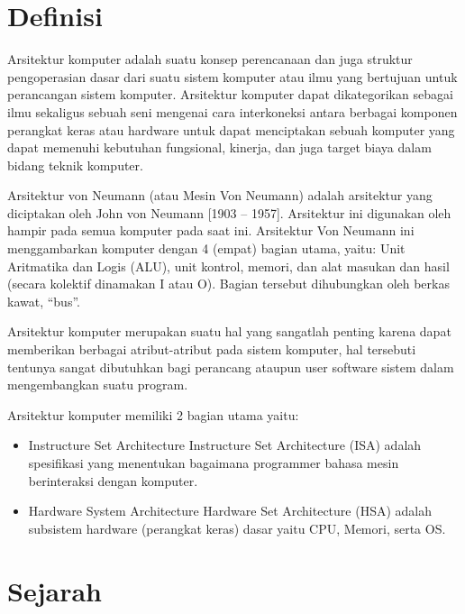 \section{Definisi}

Arsitektur komputer adalah suatu konsep perencanaan dan juga struktur pengoperasian dasar dari suatu sistem komputer atau ilmu yang bertujuan untuk perancangan sistem komputer. Arsitektur komputer dapat dikategorikan sebagai ilmu sekaligus sebuah seni mengenai cara interkoneksi antara berbagai komponen perangkat keras atau hardware untuk dapat menciptakan sebuah komputer yang dapat memenuhi kebutuhan fungsional, kinerja, dan juga target biaya dalam bidang teknik komputer. 

Arsitektur  von Neumann (atau Mesin Von Neumann) adalah arsitektur yang diciptakan oleh John von Neumann [1903 – 1957]. Arsitektur ini digunakan oleh hampir pada semua komputer pada saat ini. Arsitektur Von Neumann ini menggambarkan komputer dengan 4 (empat) bagian utama, yaitu: Unit Aritmatika dan Logis (ALU), unit kontrol, memori, dan alat masukan dan hasil (secara kolektif dinamakan I atau O). Bagian tersebut dihubungkan oleh berkas kawat, “bus”. 

Arsitektur komputer merupakan suatu hal yang sangatlah penting karena dapat memberikan berbagai atribut-atribut pada sistem komputer, hal tersebuti tentunya sangat dibutuhkan bagi perancang ataupun user software sistem dalam mengembangkan suatu program.

Arsitektur komputer memiliki 2 bagian utama yaitu:
\begin{itemize}
\item Instructure Set Architecture
Instructure Set Architecture (ISA) adalah spesifikasi yang menentukan bagaimana programmer bahasa mesin berinteraksi dengan komputer.
\item Hardware System Architecture
Hardware Set Architecture (HSA) adalah subsistem hardware (perangkat keras) dasar yaitu CPU, Memori, serta OS.

\end{itemize}


\section{Sejarah}

